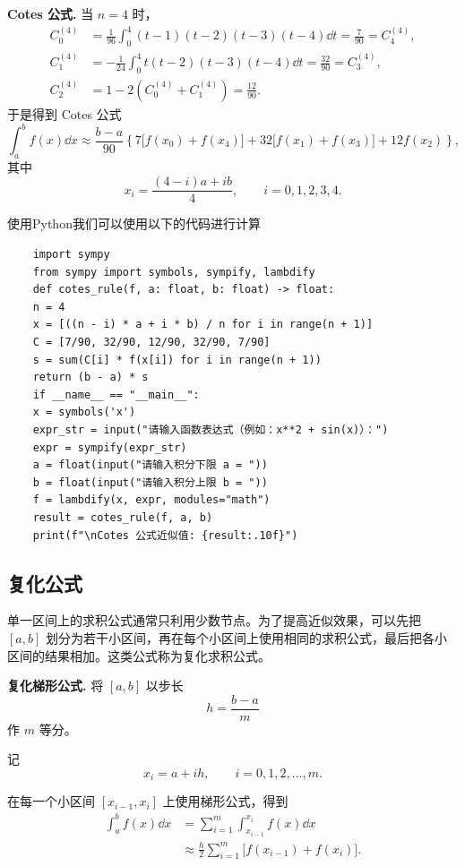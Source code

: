 \begin{example}
	\textbf{Cotes 公式.}
	当 $n=4$ 时，
	\[
	\begin{aligned}
		C_0^{(4)}
		&=\frac1{96}\int_0^4(t-1)(t-2)(t-3)(t-4)\dd t
		=\frac7{90}=C_4^{(4)},\\[4pt]
		C_1^{(4)}
		&=-\frac1{24}\int_0^4t(t-2)(t-3)(t-4)\dd t
		=\frac{32}{90}=C_3^{(4)},\\[4pt]
		C_2^{(4)}
		&=1-2\left(C_0^{(4)}+C_1^{(4)}\right)=\frac{12}{90}.
	\end{aligned}
	\]
	于是得到 Cotes 公式
	\[
	\int_a^b f(x)\dd x
	\approx \frac{b-a}{90}
	\left\{7\bigl[f(x_0)+f(x_4)\bigr]
	+32\bigl[f(x_1)+f(x_3)\bigr]+12f(x_2)\right\},
	\]
	其中
	\[
	x_i=\frac{(4-i)a+ib}{4},\qquad i=0,1,2,3,4.
	\]
	
\end{example}
使用Python我们可以使用以下的代码进行计算
\begin{verbatim}
	import sympy
	from sympy import symbols, sympify, lambdify
	def cotes_rule(f, a: float, b: float) -> float:
	n = 4
	x = [((n - i) * a + i * b) / n for i in range(n + 1)]
	C = [7/90, 32/90, 12/90, 32/90, 7/90]
	s = sum(C[i] * f(x[i]) for i in range(n + 1))
	return (b - a) * s
	if __name__ == "__main__":
	x = symbols('x')
	expr_str = input("请输入函数表达式（例如：x**2 + sin(x)）：")
	expr = sympify(expr_str)
	a = float(input("请输入积分下限 a = "))
	b = float(input("请输入积分上限 b = "))
	f = lambdify(x, expr, modules="math")
	result = cotes_rule(f, a, b)
	print(f"\nCotes 公式近似值: {result:.10f}")
\end{verbatim}


\subsection*{复化公式}

单一区间上的求积公式通常只利用少数节点。为了提高近似效果，可以先把 $[a,b]$ 划分为若干小区间，再在每个小区间上使用相同的求积公式，最后把各小区间的结果相加。这类公式称为复化求积公式。


	\textbf{复化梯形公式.}
	将 $[a,b]$ 以步长
	\[
	h=\frac{b-a}{m}
	\]
	作 $m$ 等分。

记
\[
x_i=a+ih,\qquad i=0,1,2,\dots,m.
\]

在每一个小区间 $[x_{i-1},x_i]$ 上使用梯形公式，得到
\[
\begin{aligned}
	\int_a^b f(x)\dd x
	&=\sum_{i=1}^{m}\int_{x_{i-1}}^{x_i}f(x)\dd x \\[2pt]
	&\approx \frac{h}{2}\sum_{i=1}^{m}
	\bigl[f(x_{i-1})+f(x_i)\bigr].
\end{aligned}
\]

